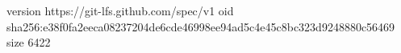 version https://git-lfs.github.com/spec/v1
oid sha256:e38f0fa2eeca08237204de6cde46998ee94ad5c4e45c8bc323d9248880c56469
size 6422
